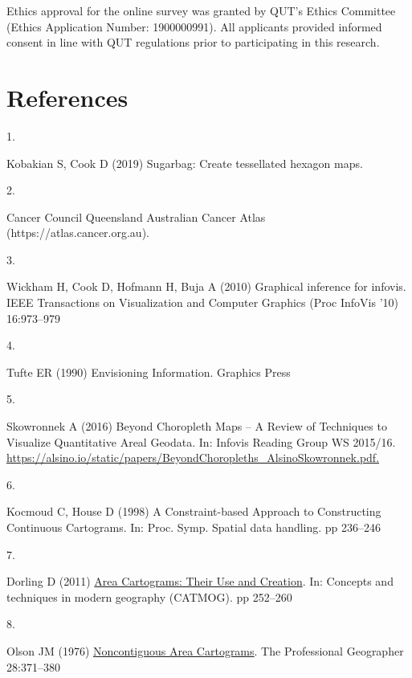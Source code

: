 \documentclass[conference,final,]{IEEEtran}
\newlength{\cslhangindent}
\newlength{\csllabelwidth}
\newlength{\cslentryspacingunit} %
\newenvironment{CSLReferences}[2] %
 {%
  \setlength{\parindent}{0pt}
  \ifodd #1
  \let\oldpar\par
  \def\par{\hangindent=\cslhangindent\oldpar}
  \fi
  \setlength{\parskip}{#2\cslentryspacingunit}
 }%
 {}
\newcommand{\CSLLeftMargin}[1]{\parbox[t]{\csllabelwidth}{#1}}
\newcommand{\CSLRightInline}[1]{\parbox[t]{\linewidth - \csllabelwidth}{#1}\break}
\begin{document}
Ethics approval for the online survey was granted by QUT's Ethics Committee (Ethics Application Number: 1900000991). All applicants provided informed consent in line with QUT regulations prior to participating in this research.

\hypertarget{references}{%
\section*{References}\label{references}}

\hypertarget{refs}{}
\begin{CSLReferences}{0}{0}
\leavevmode{}%
\CSLLeftMargin{1. }%
\CSLRightInline{Kobakian S, Cook D (2019) Sugarbag: Create tessellated hexagon maps. }

\leavevmode{}%
\CSLLeftMargin{2. }%
\CSLRightInline{Cancer Council Queensland {Australian Cancer Atlas (https://atlas.cancer.org.au)}. }

\leavevmode{}%
\CSLLeftMargin{3. }%
\CSLRightInline{Wickham H, Cook D, Hofmann H, Buja A (2010) Graphical inference for infovis. IEEE Transactions on Visualization and Computer Graphics (Proc InfoVis '10) 16:973--979}

\leavevmode{}%
\CSLLeftMargin{4. }%
\CSLRightInline{Tufte ER (1990) {Envisioning Information}. Graphics Press}

\leavevmode{}%
\CSLLeftMargin{5. }%
\CSLRightInline{Skowronnek A (2016) {Beyond Choropleth Maps -- A Review of Techniques to Visualize Quantitative Areal Geodata}. In: {Infovis Reading Group WS 2015/16}. \href{https://alsino.io/static/papers/BeyondChoropleths_AlsinoSkowronnek.pdf}{https://alsino.io/static/papers/BeyondChoropleths\_AlsinoSkowronnek.pdf. }}

\leavevmode{}%
\CSLLeftMargin{6. }%
\CSLRightInline{Kocmoud C, House D (1998) {A Constraint-based Approach to Constructing Continuous Cartograms}. In: Proc. Symp. Spatial data handling. pp 236--246}

\leavevmode{}%
\CSLLeftMargin{7. }%
\CSLRightInline{Dorling D (2011) \href{https://doi.org/10.1002/9780470979587.ch33}{{Area Cartograms: Their Use and Creation}}. In: Concepts and techniques in modern geography (CATMOG). pp 252--260}

\leavevmode{}%
\CSLLeftMargin{8. }%
\CSLRightInline{Olson JM (1976) \href{https://doi.org/10.1111/j.0033-0124.1976.00371.x}{{Noncontiguous Area Cartograms}}. The Professional Geographer 28:371--380}


\end{CSLReferences}
\end{document}
